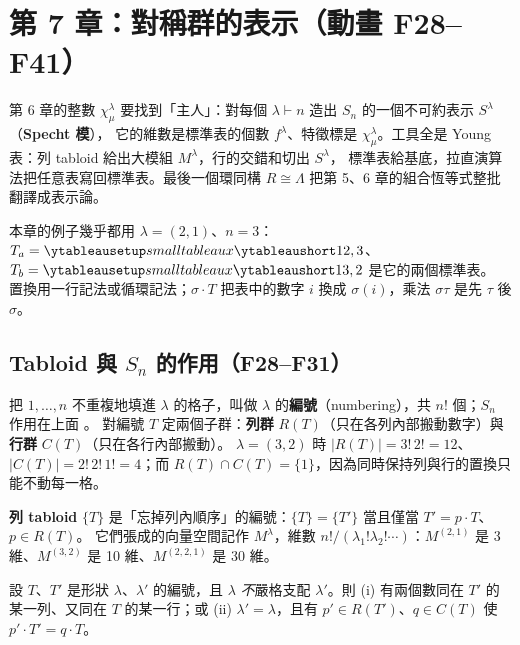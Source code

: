 
\section{第 7 章：對稱群的表示（動畫 F28--F41）}\label{sec:f-ch7}

\begin{keybox}[這一章在做什麼]
第 6 章的整數 $\chi^\lambda_\mu$ 要找到「主人」：對每個 $\lambda\vdash n$ 造出 $S_n$ 的一個不可約表示 $S^\lambda$（\textbf{Specht 模}），
它的維數是標準表的個數 $f^\lambda$、特徵標是 $\chi^\lambda_\mu$。工具全是 Young 表：列 tabloid 給出大模組 $M^\lambda$，行的交錯和切出 $S^\lambda$，
標準表給基底，拉直演算法把任意表寫回標準表。最後一個環同構 $R\cong\Lambda$ 把第 5、6 章的組合恆等式整批翻譯成表示論。
\end{keybox}

本章的例子幾乎都用 $\lambda=(2,1)$、$n=3$：$T_a=\yts{12,3}$、$T_b=\yts{13,2}$ 是它的兩個標準表。
置換用一行記法或循環記法；$\sigma\cdot T$ 把表中的數字 $i$ 換成 $\sigma(i)$，乘法 $\sigma\tau$ 是先 $\tau$ 後 $\sigma$。

\subsection{Tabloid 與 $S_n$ 的作用（F28--F31）}\label{sec:f-tabloid}

把 $1,\ldots,n$ 不重複地填進 $\lambda$ 的格子，叫做 $\lambda$ 的\textbf{編號}（numbering），共 $n!$ 個；$S_n$ 作用在上面 。
對編號 $T$ 定兩個子群：\textbf{列群} $R(T)$（只在各列內部搬動數字）與\textbf{行群} $C(T)$（只在各行內部搬動）。
$\lambda=(3,2)$ 時 $|R(T)|=3!\,2!=12$、$|C(T)|=2!\,2!\,1!=4$；而 $R(T)\cap C(T)=\{1\}$，因為同時保持列與行的置換只能不動每一格。

\textbf{列 tabloid} $\{T\}$ 是「忘掉列內順序」的編號：$\{T\}=\{T'\}$ 當且僅當 $T'=p\cdot T$、$p\in R(T)$。
它們張成的向量空間記作 $M^\lambda$，維數 $n!/(\lambda_1!\lambda_2!\cdots)$：$M^{(2,1)}$ 是 3 維、$M^{(3,2)}$ 是 10 維、$M^{(2,2,1)}$ 是 30 維。

\begin{thmbox}
設 $T$、$T'$ 是形狀 $\lambda$、$\lambda'$ 的編號，且 $\lambda$ \emph{不}嚴格支配 $\lambda'$。則
(i) 有兩個數同在 $T'$ 的某一列、又同在 $T$ 的某一行；或 (ii) $\lambda'=\lambda$，且有 $p'\in R(T')$、$q\in C(T)$ 使 $p'\cdot T'=q\cdot T$。
\end{thmbox}

